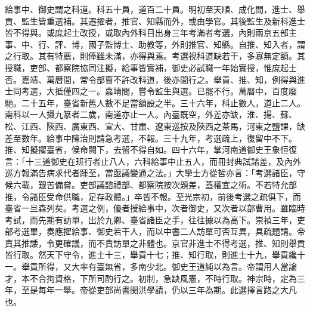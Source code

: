 給事中、御史謂之科道。科五十員，道百二十員。明初至天順、成化間，進士、舉貢、監生皆重選補。其遷擢者，推官、知縣而外，或由學官。其後監生及新科進士皆不得與。或庶起士改授，或取內外科目出身三年考滿者考選，內則兩京五部主事、中、行、評、博，國子監博士、助教等，外則推官、知縣。自推、知入者，謂之行取。其有特薦，則俸雖未滿，亦得與焉。考選視科道缺若干，多寡無定額。其授職，吏部、都察院協同注擬，給事皆實補，御史必試職一年始實授，惟庶起士否。嘉靖、萬曆間，常令部曹不許改科道，後亦間行之。舉貢、推、知，例得與進士同考選，大抵僅四之一。嘉靖間，嘗令監生與選。已罷不行。萬曆中，百度廢馳。二十五年，臺省新舊人數不足當額設之半。三十六年，科止數人，道止二人。南科以一人攝九篆者二歲，南道亦止一人。內臺既空，外差亦缺，淮、揚、蘇、松、江西、陝西、廣東西、宣大、甘肅、遼東巡按及陝西之茶馬，河東之鹽課，缺差至數年。給事中陳治則請急考選，不報。三十九年，考選疏上，復留中不下。推、知擬擢臺省，候命闕下，去留不得自如。四十六年，掌河南道御史王象恒復言：「十三道御史在班行者止八人，六科給事中止五人，而冊封典試諸差，及內外巡方報滿告病求代者踵至，當亟議變通之法。」大學士方從哲亦言：「考選諸臣，守候六載，艱苦備嘗。吏部議諮禮部、都察院按次題差，蓋權宜之術。不若特允部推，令諸臣受命供職，足存政體。」卒皆不報。至光宗初，前後考選之疏俱下，而臺省一旦森列矣。考選之例，優者授給事中，次者御史，又次者以部曹用。雖臨時考試，而先期有訪單，出於九卿、臺省諸臣之手，往往據以為高下。崇禎三年，吏部考選畢，奏應擢給事、御史若干人，而以中書二人訪單可否互異，具疏題請。帝責其推諉，令更確議，而不責訪單之非體也。京官非進士不得考選，推、知則舉貢皆行取。然天下守令，進士十三，舉貢十七；推、知行取，則進士十九，舉貢纔十一。舉貢所得，又大率有臺無省，多南少北。御史王道純以為言。帝謂用人當論才，本不合拘資格，下所司酌行之。初制，急缺風憲，不時行取。神宗時，定為三年，至是每年一舉。帝從吏部尚書閔洪學請，仍以三年為期。此選擇言路之大凡也。

